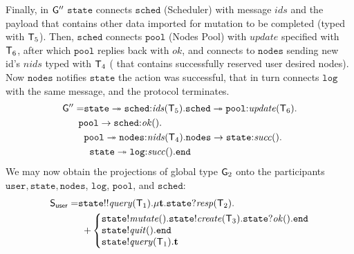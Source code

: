 \noindent
Finally, in ${\sf G}''$ $\mathtt{state}$ connects $\mathtt{sched}$ (Scheduler) with message $\mathit{ids}$ and the payload that contains other data imported for mutation to be completed (typed with ${\mathsf T}_5$). 
Then, $\mathtt{sched}$ connects $\mathtt{pool}$ (Nodes Pool) with $\mathit{update}$ specified with ${\mathsf T}_6$, after which $\mathtt{pool}$ replies back with $\mathit{ok}$, and connects to $\mathtt{nodes}$ sending new id's $\mathit{nids}$ typed with ${\mathsf T}_4$ ( that contains successfully reserved user desired nodes). Now $\mathtt{nodes}$ notifies $\mathtt{state}$ the action was successful, that in turn connects $\mathtt{log}$ with the same message, and the protocol terminates.
\begin{align*}
\G'' = &
\mathtt{state}\twoheadrightarrow\mathtt{sched}{:}\mathit{ids}(\T_5).
\mathtt{sched}\twoheadrightarrow\mathtt{pool}{:}\mathit{update}(\T_6). \\
& \hspace{-2mm}
\mathtt{pool}\to\mathtt{sched}{:}\mathit{ok}(). \\
& %
\mathtt{pool}\twoheadrightarrow\mathtt{nodes}{:}\mathit{nids}(\T_4). 
\mathtt{nodes}\to\mathtt{state}{:}\mathit{succ}(). \\
& \hspace{2mm}
\mathtt{state}\twoheadrightarrow \mathtt{log}{:}\mathit{succ}().\tend
\end{align*}
We may now obtain the projections of global type ${\sf G}_2$ onto the participants $\mathtt{user}, \mathtt{state}, \mathtt{nodes}$, $\mathtt{log}$, $\mathtt{pool}$, and $\mathtt{sched}$:
\begin{align*}
\ST_\mathsf{user} = & 
\mathtt{state}{!!}\mathit{query}(\T_1).\mu \ty. 
\mathtt{state}{?}\mathit{resp}(\T_2).\\
& \hspace{2mm}
{+}
\left\{
\begin{array}{@{}l@{}}
\mathtt{state}{!}\mathit{mutate}().\mathtt{state}{!}\mathit{create}(\T_3).\mathtt{state}{?}\mathit{ok}().\tend\\
\mathtt{state}{!}\mathit{quit}().\tend\\
\mathtt{state}{!}\mathit{query}(\T_1).\ty
\end{array} \right.
\end{align*}
